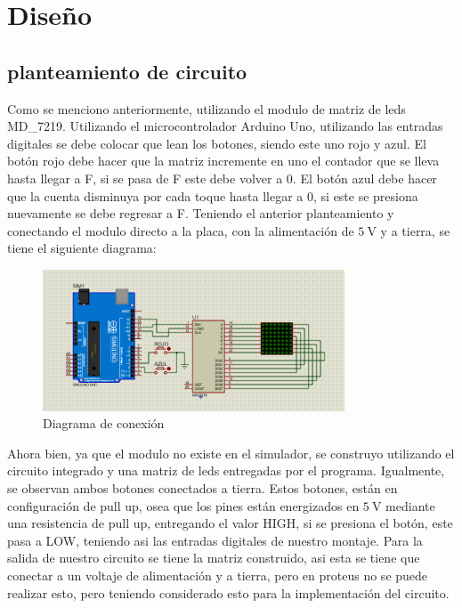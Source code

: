 \section{Diseño}

\subsection{planteamiento de circuito}
Como se menciono anteriormente, utilizando el modulo de matriz de leds MD\_7219.
Utilizando el microcontrolador Arduino Uno, utilizando las entradas digitales se debe 
colocar que lean los botones, siendo este uno rojo y azul. El botón rojo debe hacer que la matriz 
incremente en uno el contador que se lleva hasta llegar a F, si se pasa de F este debe volver a 0. El botón
azul debe hacer que la cuenta disminuya por cada toque hasta llegar a 0, si este se presiona nuevamente se debe
regresar a F. Teniendo el anterior planteamiento y conectando el modulo directo a la placa, con la alimentación
de $\SI{5}{\volt}$ y a tierra, se tiene el siguiente diagrama:
\begin{figure}[h!]
    \centering
    \includegraphics[width=0.8\textwidth]{Diagramas/Diagrama.png}
    \caption{Diagrama de conexión}
    \label{fig:conexion}
\end{figure}

Ahora bien, ya que el modulo no existe en el simulador, se construyo utilizando el circuito integrado y una matriz de leds
entregadas por el programa. Igualmente, se observan ambos botones conectados a tierra. Estos botones, están en configuración
de pull up, osea que los pines están energizados en $\SI{5}{\volt}$ mediante una resistencia de pull up, entregando el valor HIGH,
si se presiona el botón, este pasa a LOW, teniendo asi las entradas digitales de nuestro montaje. Para la salida de nuestro circuito 
se tiene la matriz construido, asi esta se tiene que conectar a un voltaje de alimentación y a tierra, pero en proteus no se puede realizar esto, 
pero teniendo considerado esto para la implementación del circuito.

